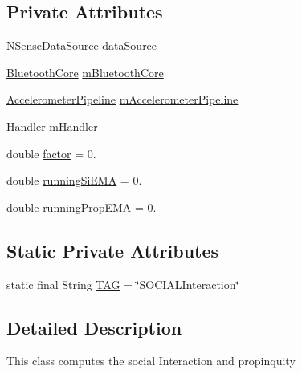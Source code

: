 \subsection*{Private Attributes}
\begin{DoxyCompactItemize}
\item 
\hyperlink{classcs_1_1nsense_1_1db_1_1_n_sense_data_source}{N\-Sense\-Data\-Source} \hyperlink{classcs_1_1nsense_1_1inference_module_1_1_social_interaction_a1fee12b3051e148b656e1138932eeea4}{data\-Source}
\item 
\hyperlink{classcs_1_1nsense_1_1bluetooth_1_1_bluetooth_core}{Bluetooth\-Core} \hyperlink{classcs_1_1nsense_1_1inference_module_1_1_social_interaction_a8738fb102c15b3e5743b011ada07ccd5}{m\-Bluetooth\-Core}
\item 
\hyperlink{classcs_1_1nsense_1_1accelerometer_1_1_accelerometer_pipeline}{Accelerometer\-Pipeline} \hyperlink{classcs_1_1nsense_1_1inference_module_1_1_social_interaction_aa9213db0db3e17b869c53f146a8b29ac}{m\-Accelerometer\-Pipeline}
\item 
Handler \hyperlink{classcs_1_1nsense_1_1inference_module_1_1_social_interaction_a559c79ab481a825dbdd096c67983293f}{m\-Handler}
\item 
double \hyperlink{classcs_1_1nsense_1_1inference_module_1_1_social_interaction_ae7489e6ca7c8a983bef3bfdb6917653d}{factor} = 0.
\item 
double \hyperlink{classcs_1_1nsense_1_1inference_module_1_1_social_interaction_ae4104c0160e4ab9e56047ecebcb57f91}{running\-Si\-E\-M\-A} = 0.
\item 
double \hyperlink{classcs_1_1nsense_1_1inference_module_1_1_social_interaction_aaf7bdd81db03af4288d6b9fb8adc86e4}{running\-Prop\-E\-M\-A} = 0.
\end{DoxyCompactItemize}
\subsection*{Static Private Attributes}
\begin{DoxyCompactItemize}
\item 
static final String \hyperlink{classcs_1_1nsense_1_1inference_module_1_1_social_interaction_a8e890805038a74a8fd5aa9e57a09cd61}{T\-A\-G} = \char`\"{}S\-O\-C\-I\-A\-L\-Interaction\char`\"{}
\end{DoxyCompactItemize}


\subsection{Detailed Description}
This class computes the social Interaction and propinquity 

